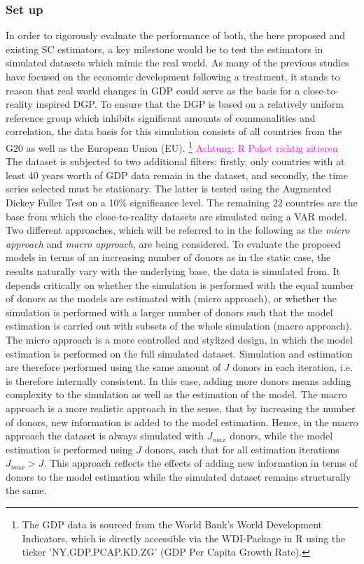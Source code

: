 \subsubsection{Set up}
In order to rigorously evaluate the performance of both, the here proposed and existing SC estimators, a key milestone would be to test the estimators in simulated datasets which mimic the real world. As many of the previous studies have focused on the economic development following a treatment, it stands to reason that real world changes in GDP could serve as the basis for a close-to-reality inspired DGP.
To ensure that the DGP is based on a relatively uniform reference group which inhibits significant amounts of commonalities and correlation, the data basis for this simulation consists of all countries from the G20 as well as the European Union (EU). \footnote{The GDP data is sourced from the World Bank's World Development Indicators, which is directly accessible via the WDI-Package in R using the ticker 'NY.GDP.PCAP.KD.ZG' (GDP Per Capita Growth Rate).} 
\textcolor{magenta}{Achtung: R Paket richtig zitieren}\\
The dataset is subjected to two additional filters: firstly, only countries with at least 40 years worth of GDP data remain in the dataset, and secondly, the time series selected must be stationary. The latter is tested using the Augmented Dickey Fuller Test on a 10\% significance level. The remaining 22 countries are the base from which the close-to-reality datasets are simulated using a VAR model.\\
Two different approaches, which will be referred to in the following as the \textit{micro approach} and \textit{macro approach}, are being considered. To evaluate the proposed models in terms of an increasing number of donors as in the static case, the results naturally vary with the underlying base, the data is simulated from. 
It depends critically on whether the simulation is performed with the equal number of donors as the models are estimated with (micro approach), or whether the simulation is performed with a larger number of donors such that the model estimation is carried out with subsets of the whole simulation (macro approach).
The micro approach is a more controlled and stylized design, in which the model estimation is performed on the full simulated dataset. Simulation and estimation are therefore performed using the same amount of $J$ donors in each iteration, i.e. is therefore internally consistent. In this case, adding more donors means adding complexity to the simulation as well as the estimation of the model. The macro approach is a more realistic approach in the sense, that by increasing the number of donors, new information is added to the model estimation. Hence, in the macro approach the dataset is always simulated with $J_{max}$ donors, while the model estimation is performed using $J$ donors, such that for all estimation iterations $J_{max} > J $.  This approach reflects the effects of adding new information in terms of donors to the model estimation while the simulated dataset remains structurally the same.\\
